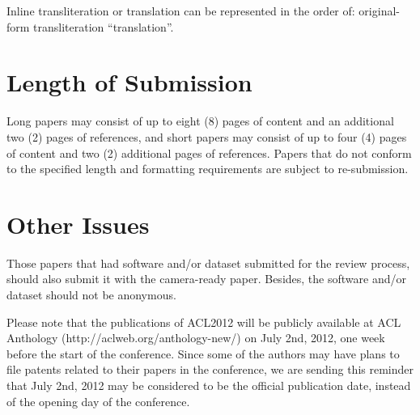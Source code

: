 \documentclass[11pt]{article}
\begin{document}
Inline transliteration or translation can be represented in
the order of: original-form transliteration ``translation''.

\section{Length of Submission}
\label{sec:length}

Long papers may consist of up to eight (8) pages of content and an
additional two (2) pages of references, and short papers may consist
of up to four (4) pages of content and two (2) additional pages of
references.  Papers that do not conform to the specified length and
formatting requirements are subject to re-submission.

\section{Other Issues}
 
Those papers that had software and/or dataset submitted for the review process, should also submit it 
with the camera-ready paper. Besides, the software and/or dataset should not be anonymous. 

Please note that the publications of ACL2012 will be publicly available at ACL Anthology 
(http://aclweb.org/anthology-new/) on July 2nd, 2012, one week before the start of the conference. 
Since some of the authors may have plans to file patents related to their papers in the conference, 
we are sending this reminder that July 2nd, 2012 may be considered to be the official publication date, 
instead of the opening day of the conference.


\end{document}
